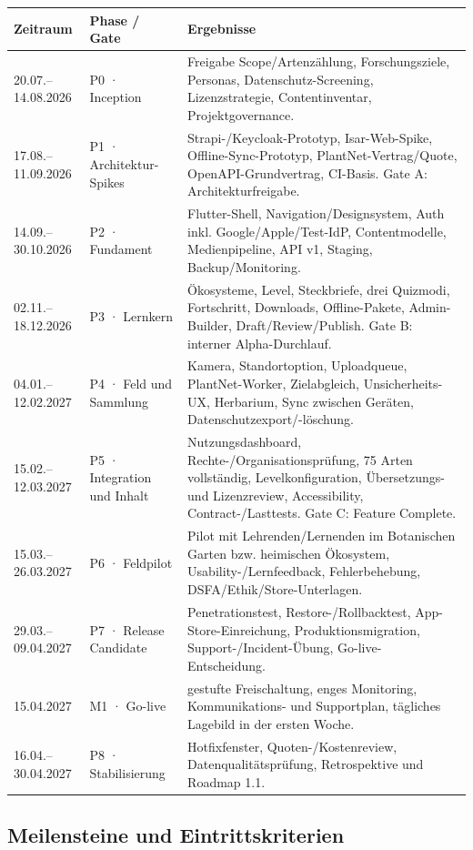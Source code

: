 \documentclass[10pt,a4paper,oneside]{article}
\begin{document}
\begin{longtable}{@{}p{23mm}p{36mm}p{99mm}@{}}
\toprule
\textbf{Zeitraum} & \textbf{Phase / Gate} & \textbf{Ergebnisse} \\
\midrule
\endhead
20.07.--14.08.2026 & P0 · Inception & Freigabe Scope/Artenzählung, Forschungsziele, Personas, Datenschutz-Screening, Lizenzstrategie, Contentinventar, Projektgovernance. \\
17.08.--11.09.2026 & P1 · Architektur-Spikes & Strapi-/Keycloak-Prototyp, Isar-Web-Spike, Offline-Sync-Prototyp, PlantNet-Vertrag/Quote, OpenAPI-Grundvertrag, CI-Basis. Gate A: Architekturfreigabe. \\
14.09.--30.10.2026 & P2 · Fundament & Flutter-Shell, Navigation/Designsystem, Auth inkl. Google/Apple/Test-IdP, Contentmodelle, Medienpipeline, API v1, Staging, Backup/Monitoring. \\
02.11.--18.12.2026 & P3 · Lernkern & Ökosysteme, Level, Steckbriefe, drei Quizmodi, Fortschritt, Downloads, Offline-Pakete, Admin-Builder, Draft/Review/Publish. Gate B: interner Alpha-Durchlauf. \\
04.01.--12.02.2027 & P4 · Feld und Sammlung & Kamera, Standortoption, Uploadqueue, PlantNet-Worker, Zielabgleich, Unsicherheits-UX, Herbarium, Sync zwischen Geräten, Datenschutzexport/-löschung. \\
15.02.--12.03.2027 & P5 · Integration und Inhalt & Nutzungsdashboard, Rechte-/Organisationsprüfung, 75 Arten vollständig, Levelkonfiguration, Übersetzungs- und Lizenzreview, Accessibility, Contract-/Lasttests. Gate C: Feature Complete. \\
15.03.--26.03.2027 & P6 · Feldpilot & Pilot mit Lehrenden/Lernenden im Botanischen Garten bzw. heimischen Ökosystem, Usability-/Lernfeedback, Fehlerbehebung, DSFA/Ethik/Store-Unterlagen. \\
29.03.--09.04.2027 & P7 · Release Candidate & Penetrationstest, Restore-/Rollbacktest, App-Store-Einreichung, Produktionsmigration, Support-/Incident-Übung, Go-live-Entscheidung. \\
15.04.2027 & M1 · Go-live & gestufte Freischaltung, enges Monitoring, Kommunikations- und Supportplan, tägliches Lagebild in der ersten Woche. \\
16.04.--30.04.2027 & P8 · Stabilisierung & Hotfixfenster, Quoten-/Kostenreview, Datenqualitätsprüfung, Retrospektive und Roadmap 1.1. \\
\bottomrule
\end{longtable}

\subsection{Meilensteine und Eintrittskriterien}
\end{document}
